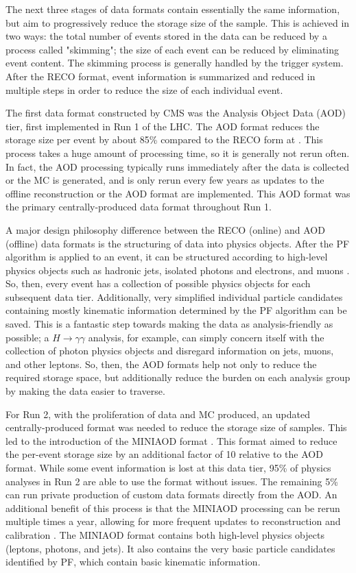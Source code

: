 \documentclass[12pt]{ucsddissertation}
\begin{document}
The next three stages of data formats contain essentially the same information, but aim to progressively reduce the storage size of the sample. This is achieved in two ways: the total number of events stored in the data can be reduced by a process called "skimming"; the size of each event can be reduced by eliminating event content. The skimming process is generally handled by the trigger system. After the RECO format, event information is summarized and reduced in multiple steps in order to reduce the size of each individual event. 

The first data format constructed by CMS was the Analysis Object Data (AOD) tier, first implemented in Run 1 of the LHC. The AOD format reduces the storage size per event by about 85\% compared to the RECO form at \cite{NanoAOD}. This process takes a huge amount of processing time, so it is generally not rerun often. In fact, the AOD processing typically runs immediately after the data is collected or the MC is generated, and is only rerun every few years as updates to the offline reconstruction or the AOD format are implemented. This AOD format was the primary centrally-produced data format throughout Run 1.

A major design philosophy difference between the RECO (online) and AOD (offline) data formats is the structuring of data into physics objects. After the PF algorithm is applied to an event, it can be structured according to high-level physics objects such as hadronic jets, isolated photons and electrons, and muons \cite{ParticleFlow}. So, then, every event has a collection of possible physics objects for each subsequent data tier. Additionally, very simplified individual particle candidates containing mostly kinematic information determined by the PF algorithm can be saved. This is a fantastic step towards making the data as analysis-friendly as possible; a $H \rightarrow \gamma \gamma$ analysis, for example, can simply concern itself with the collection of photon physics objects and disregard information on jets, muons, and other leptons. So, then, the AOD formats help not only to reduce the required storage space, but additionally reduce the burden on each analysis group by making the data easier to traverse.  

For Run 2, with the proliferation of data and MC produced, an updated centrally-produced format was needed to reduce the storage size of samples. This led to the introduction of the MINIAOD format \cite{MiniAOD}. This format aimed to reduce the per-event storage size by an additional factor of 10 relative to the AOD format. While some event information is lost at this data tier, 95\% of physics analyses in Run 2 are able to use the format without issues. The remaining 5\% can run private production of custom data formats directly from the AOD. An additional benefit of this process is that the MINIAOD processing can be rerun multiple times a year, allowing for more frequent updates to reconstruction and calibration \cite{NanoAOD}. The MINIAOD format contains both high-level physics objects (leptons, photons, and jets). It also contains the very basic particle candidates identified by PF, which contain basic kinematic information.
\end{document}
